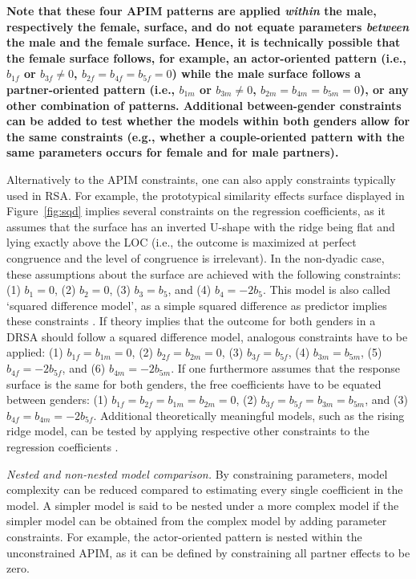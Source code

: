 \documentclass[jou,a4paper,draftfirst]{apa6}
\newcommand{\added}[1]{\textcolor{colour_added}{\bf{#1}}}
\begin{document}
\added{Note that these four APIM patterns are applied \emph{within} the male, respectively the female, surface, and do not equate parameters \emph{between} the male and the female surface. Hence, it is technically possible that the female surface follows, for example, an actor-oriented pattern (i.e., $b_{1f}$ or $b_{3f} \neq 0$, $b_{2f} = b_{4f} = b_{5f} = 0$) while the male surface follows a partner-oriented pattern (i.e., $b_{1m}$ or $b_{3m} \neq 0$, $b_{2m} = b_{4m} = b_{5m} = 0$), or any other combination of patterns. Additional between-gender constraints can be added to test whether the models within both genders allow for the same constraints (e.g., whether a couple-oriented pattern with the same parameters occurs for female and for male partners).}

Alternatively to the APIM constraints, one can also apply constraints typically used in RSA. For example, the prototypical similarity effects surface displayed in Figure~\ref{fig:sqd} implies several constraints on the regression coefficients, as it assumes that the surface has an inverted U-shape with the ridge being flat and lying exactly above the LOC (i.e., the outcome is maximized at perfect congruence and the level of congruence is irrelevant). In the non-dyadic case, these assumptions about the surface are achieved with the following constraints: (1) $b_1 = 0$, (2) $b_2 = 0$, (3) $b_3 = b_5$, and (4) $b_4 = -2 b_5$. This model is also called `squared difference model', as a simple squared difference as predictor implies these constraints \parencite{edwards_alternatives_2002,schonbrodt_testing_2016}. If theory implies that the outcome for both genders in a DRSA should follow a squared difference model, analogous constraints have to be applied: (1) $b_{1f} = b_{1m} = 0$, (2) $b_{2f} = b_{2m} = 0$, (3) $b_{3f} = b_{5f}$, (4) $b_{3m} = b_{5m}$, (5) $b_{4f} = -2 b_{5f}$, and (6) $b_{4m} = -2 b_{5m}$. If one furthermore assumes that the response surface is the same for both genders, the free coefficients have to be equated between genders: (1) $b_{1f} = b_{2f} = b_{1m} = b_{2m} = 0$, (2) $b_{3f} = b_{5f} = b_{3m} = b_{5m}$, and (3) $b_{4f} = b_{4m} = -2 b_{5f}$. Additional theoretically meaningful models, such as the rising ridge model, can be tested by applying respective other constraints to the regression coefficients \parencite{schonbrodt_testing_2016}.

\emph{Nested and non-nested model comparison.}
By constraining parameters, model complexity can be reduced compared to estimating every single coefficient in the model. A simpler model is said to be nested under a more complex model if the simpler model can be obtained from the complex model by adding parameter constraints. For example, the actor-oriented pattern is nested within the unconstrained APIM, as it can be defined by constraining all partner effects to be zero. 
\end{document}
